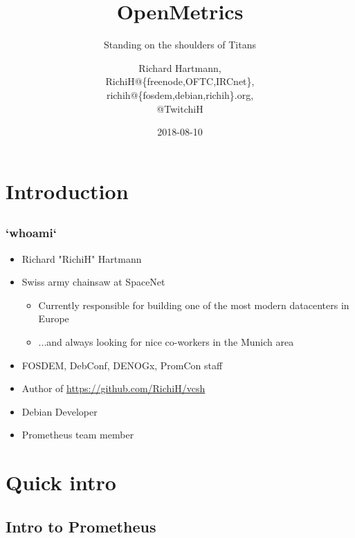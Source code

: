 \documentclass[t]{beamer}
\title{OpenMetrics}
\subtitle{Standing on the shoulders of Titans}
\author{Richard Hartmann,\\
RichiH@\{freenode,OFTC,IRCnet\},\\
richih@\{fosdem,debian,richih\}.org,\\
@TwitchiH}
\date{2018-08-10}
\begin{document}
\setcounter{tocdepth}{1}

\section{Introduction}

\subsection{}

\begin{frame}
	\titlepage
\end{frame}


\subsection{}

\begin{frame}
	\frametitle{`whoami`}
	\begin{itemize}
		\item Richard "RichiH" Hartmann
		\item Swiss army chainsaw at SpaceNet
		\begin{itemize}
			\item Currently responsible for building one of the most modern datacenters in Europe
			\item ...and always looking for nice co-workers in the Munich area
		\end{itemize}
		\item FOSDEM, DebConf, DENOGx, PromCon staff
		\item Author of \url{https://github.com/RichiH/vcsh}
		\item Debian Developer
		\item Prometheus team member
	\end{itemize}
\end{frame}


\section{Quick intro}

\subsection{Intro to Prometheus}
\end{document}
